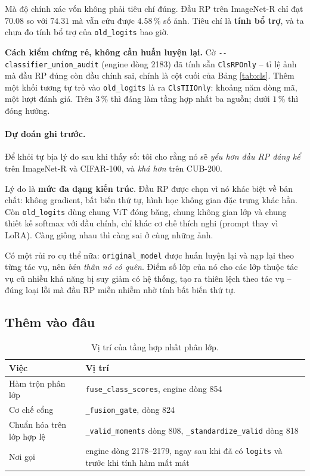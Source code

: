 \documentclass[11pt,a4paper]{article}
\newenvironment{luuy}{\begin{leftbar}\noindent\ignorespaces}{\end{leftbar}}
\begin{document}
Mà độ chính xác vốn không phải tiêu chí đúng. Đầu RP trên ImageNet-R chỉ đạt
$70.08$ so với $74.31$ mà vẫn cứu được $4.58\,\%$ số ảnh. Tiêu chí là
\textbf{tính bổ trợ}, và ta chưa đo tính bổ trợ của \texttt{old\_logits} bao giờ.

\begin{luuy}
\textbf{Cách kiểm chứng rẻ, không cần huấn luyện lại.} Cờ
\texttt{-{}-classifier\_union\_audit} (engine dòng 2183) đã tính sẵn
\texttt{ClsRPOnly} -- tỉ lệ ảnh mà đầu RP đúng còn đầu chính sai, chính là cột
cuối của Bảng \ref{tab:cls}. Thêm một khối tương tự trỏ vào \texttt{old\_logits}
là ra \texttt{ClsTIIOnly}: khoảng năm dòng mã, một lượt đánh giá. Trên
$3\,\%$ thì đáng làm tầng hợp nhất ba nguồn; dưới $1\,\%$ thì đóng hướng.
\end{luuy}

\paragraph{Dự đoán ghi trước.}
Để khỏi tự bịa lý do sau khi thấy số: tôi cho rằng nó sẽ \emph{yếu hơn đầu RP
đáng kể} trên ImageNet-R và CIFAR-100, và \emph{khá hơn} trên CUB-200.

Lý do là \textbf{mức đa dạng kiến trúc}. Đầu RP được chọn vì nó khác biệt về bản
chất: không gradient, bất biến thứ tự, hình học không gian đặc trưng khác hẳn.
Còn \texttt{old\_logits} dùng chung ViT đóng băng, chung không gian lớp và chung
thiết kế softmax với đầu chính, chỉ khác cơ chế thích nghi (prompt thay vì LoRA).
Càng giống nhau thì càng sai ở cùng những ảnh.

Có một rủi ro cụ thể nữa: \texttt{original\_model} được huấn luyện lại và nạp lại
theo từng tác vụ, nên \emph{bản thân nó có quên}. Điểm số lớp của nó cho các lớp
thuộc tác vụ cũ nhiều khả năng bị suy giảm có hệ thống, tạo ra thiên lệch theo
tác vụ -- đúng loại lỗi mà đầu RP miễn nhiễm nhờ tính bất biến thứ tự.

\subsection{Thêm vào đâu}

\begin{table}[htbp]
\centering
\caption{Vị trí của tầng hợp nhất phân lớp.}
\begin{tabular}{lL}
\toprule
Việc & Vị trí \\
\midrule
Hàm trộn phân lớp & \texttt{fuse\_class\_scores}, engine dòng 854 \\
Cơ chế cổng & \texttt{\_fusion\_gate}, dòng 824 \\
Chuẩn hóa trên lớp hợp lệ
  & \texttt{\_valid\_moments} dòng 808, \texttt{\_standardize\_valid} dòng 818 \\
Nơi gọi & engine dòng 2178--2179, ngay sau khi đã có \texttt{logits} và trước
          khi tính hàm mất mát \\
\bottomrule
\end{tabular}
\end{table}
\end{document}
